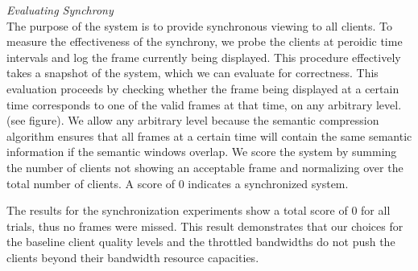 \documentclass{sig-alternate}
\begin{document}
 

\textit{Evaluating Synchrony} \\ The purpose of the system is to
provide synchronous viewing to all clients.  To measure the
effectiveness of the synchrony, we probe the clients at peroidic time
intervals and log the frame currently being displayed.  This procedure
effectively takes a snapshot of the system, which we can evaluate for
correctness.  This evaluation proceeds by checking whether the frame
being displayed at a certain time corresponds to one of the valid
frames at that time, on any arbitrary level.  (see figure).  We allow
any arbitrary level because the semantic compression algorithm ensures
that all frames at a certain time will contain the same semantic
information if the semantic windows overlap.  We score the system by
summing the number of clients not showing an acceptable frame and
normalizing over the total number of clients.  A score of 0 indicates
a synchronized system.

The results for the synchronization experiments show a total score of
0 for all trials, thus no frames were missed.  This result
demonstrates that our choices for the baseline client quality levels
and the throttled bandwidths do not push the clients beyond their
bandwidth resource capacities.


\end{document}
